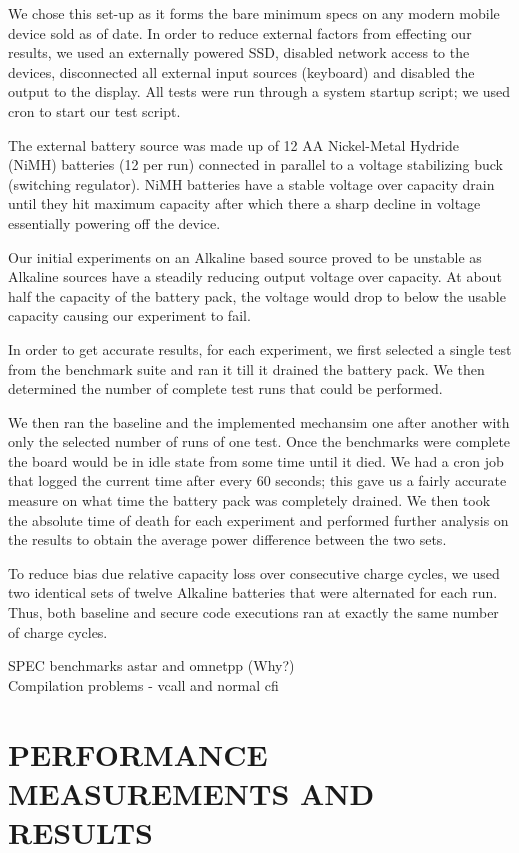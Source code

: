 \documentclass[letterpaper, 10 pt, conference]{ieeeconf}  %
\begin{document}
We chose this set-up as it forms the bare minimum specs on any modern mobile device sold as of date. In order to reduce external factors from effecting our results, we used an externally powered SSD, disabled network access to the devices, disconnected all external input sources (keyboard) and disabled the output to the display. All tests were run through a system startup script; we used cron to start our test script.

The external battery source was made up of 12 AA Nickel-Metal Hydride (NiMH) batteries (12 per run) connected in parallel to a voltage stabilizing buck (switching regulator). NiMH batteries have a stable voltage over capacity drain until they hit maximum capacity after which there a sharp decline in voltage essentially powering off the device.

Our initial experiments on an Alkaline based source proved to be unstable as Alkaline sources have a steadily reducing output voltage over capacity. At about half the capacity of the battery pack, the voltage would drop to below the usable capacity causing our experiment to fail.

In order to get accurate results, for each experiment, we first selected a single test from the benchmark suite and ran it till it drained the battery pack. We then determined the number of complete test runs that could be performed.

We then ran the baseline and the implemented mechansim one after another with only the selected number of runs of one test. Once the benchmarks were complete the board would be in idle state from some time until it died. We had a cron job that logged the current time after every 60 seconds; this gave us a fairly accurate measure on what time the battery pack was completely drained. We then took the absolute time of death for each experiment and performed further analysis on the results to obtain the average power difference between the two sets.

To reduce bias due relative capacity loss over consecutive charge cycles, we used two identical sets of twelve Alkaline batteries that were alternated for each run. Thus, both baseline and secure code executions ran at exactly the same number of charge cycles.

SPEC benchmarks astar and omnetpp (Why?) \\
Compilation problems - vcall and normal cfi \\

\section{PERFORMANCE MEASUREMENTS AND RESULTS}
\end{document}
